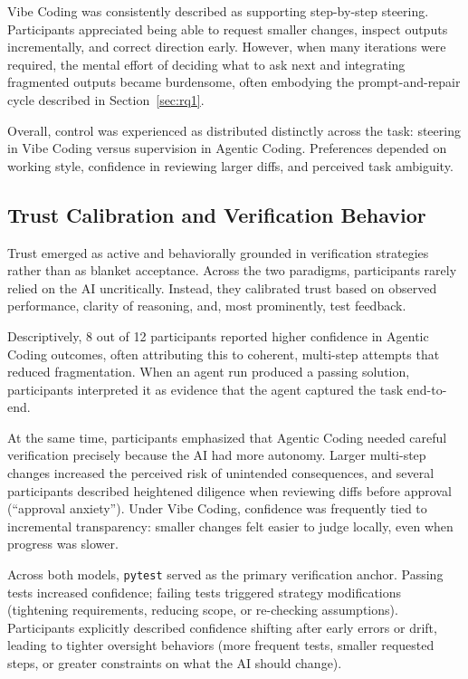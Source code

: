 Vibe Coding was consistently described as supporting step-by-step steering. Participants appreciated being able to request smaller changes, inspect outputs incrementally, and correct direction early. However, when many iterations were required, the mental effort of deciding what to ask next and integrating fragmented outputs became burdensome, often embodying the prompt-and-repair cycle described in Section~\ref{sec:rq1}.

Overall, control was experienced as distributed distinctly across the task: steering in Vibe Coding versus supervision in Agentic Coding. Preferences depended on working style, confidence in reviewing larger diffs, and perceived task ambiguity.

\subsection{Trust Calibration and Verification Behavior}

Trust emerged as active and behaviorally grounded in verification strategies rather than as blanket acceptance. Across the two paradigms, participants rarely relied on the AI uncritically. Instead, they calibrated trust based on observed performance, clarity of reasoning, and, most prominently, test feedback.

Descriptively, 8 out of 12 participants reported higher confidence in Agentic Coding outcomes, often attributing this to coherent, multi-step attempts that reduced fragmentation. When an agent run produced a passing solution, participants interpreted it as evidence that the agent captured the task end-to-end.

At the same time, participants emphasized that Agentic Coding needed careful verification precisely because the AI had more autonomy. Larger multi-step changes increased the perceived risk of unintended consequences, and several participants described heightened diligence when reviewing diffs before approval (``approval anxiety''). Under Vibe Coding, confidence was frequently tied to incremental transparency: smaller changes felt easier to judge locally, even when progress was slower.

Across both models, \texttt{pytest} served as the primary verification anchor. Passing tests increased confidence; failing tests triggered strategy modifications (tightening requirements, reducing scope, or re-checking assumptions). Participants explicitly described confidence shifting after early errors or drift, leading to tighter oversight behaviors (more frequent tests, smaller requested steps, or greater constraints on what the AI should change).

